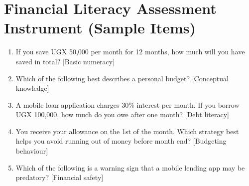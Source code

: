 \documentclass[12pt,a4paper]{report}
\begin{document}
\chapter{Financial Literacy Assessment Instrument (Sample Items)}

\begin{enumerate}
    \item If you save UGX 50,000 per month for 12 months, how much will you have saved in total? [Basic numeracy]
    \item Which of the following best describes a personal budget? [Conceptual knowledge]
    \item A mobile loan application charges 30\% interest per month. If you borrow UGX 100,000, how much do you owe after one month? [Debt literacy]
    \item You receive your allowance on the 1st of the month. Which strategy best helps you avoid running out of money before month end? [Budgeting behaviour]
    \item Which of the following is a warning sign that a mobile lending app may be predatory? [Financial safety]
\end{enumerate}
\end{document}

